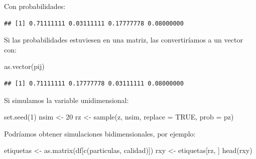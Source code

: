 \documentclass[
]{book}
\newenvironment{Shaded}{\begin{snugshade}}{\end{snugshade}}
\newcommand{\AttributeTok}[1]{\textcolor[rgb]{0.77,0.63,0.00}{#1}}
\newcommand{\ConstantTok}[1]{\textcolor[rgb]{0.00,0.00,0.00}{#1}}
\newcommand{\DecValTok}[1]{\textcolor[rgb]{0.00,0.00,0.81}{#1}}
\newcommand{\FunctionTok}[1]{\textcolor[rgb]{0.00,0.00,0.00}{#1}}
\newcommand{\NormalTok}[1]{#1}
\newcommand{\OtherTok}[1]{\textcolor[rgb]{0.56,0.35,0.01}{#1}}
\newcommand{\SpecialCharTok}[1]{\textcolor[rgb]{0.00,0.00,0.00}{#1}}
\newcommand{\StringTok}[1]{\textcolor[rgb]{0.31,0.60,0.02}{#1}}
\theoremstyle{break}
\theoremstyle{definition}
\theoremstyle{definition}
\theoremstyle{definition}
\theoremstyle{definition}
\theoremstyle{remark}
\begin{document}
Con probabilidades:

\begin{Shaded}
\end{Shaded}

\begin{verbatim}
## [1] 0.71111111 0.03111111 0.17777778 0.08000000
\end{verbatim}

Si las probabilidades estuviesen en una matriz, las convertiríamos a un
vector con:

\begin{Shaded}
\begin{Highlighting}[]
\FunctionTok{as.vector}\NormalTok{(pij)}
\end{Highlighting}
\end{Shaded}

\begin{verbatim}
## [1] 0.71111111 0.17777778 0.03111111 0.08000000
\end{verbatim}

Si simulamos la variable unidimensional:

\begin{Shaded}
\begin{Highlighting}[]
\FunctionTok{set.seed}\NormalTok{(}\DecValTok{1}\NormalTok{)}
\NormalTok{nsim }\OtherTok{\textless{}{-}} \DecValTok{20}
\NormalTok{rz }\OtherTok{\textless{}{-}} \FunctionTok{sample}\NormalTok{(z, nsim, }\AttributeTok{replace =} \ConstantTok{TRUE}\NormalTok{, }\AttributeTok{prob =}\NormalTok{ pz)}
\end{Highlighting}
\end{Shaded}

Podríamos obtener simulaciones bidimensionales, por ejemplo:

\begin{Shaded}
\begin{Highlighting}[]
\NormalTok{etiquetas }\OtherTok{\textless{}{-}} \FunctionTok{as.matrix}\NormalTok{(df[}\FunctionTok{c}\NormalTok{(}\StringTok{\textquotesingle{}particulas\textquotesingle{}}\NormalTok{, }\StringTok{\textquotesingle{}calidad\textquotesingle{}}\NormalTok{)])}
\NormalTok{rxy }\OtherTok{\textless{}{-}}\NormalTok{ etiquetas[rz, ]}
\FunctionTok{head}\NormalTok{(rxy)}
\end{Highlighting}
\end{Shaded}
\end{document}
